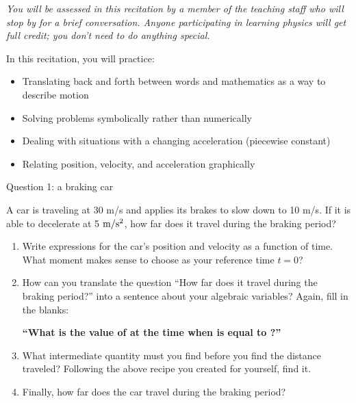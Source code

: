 \documentclass[12pt]{article}
\newcommand{\BI}{\begin{itemize}}
\newcommand{\EI}{\end{itemize}}
\begin{document}
\Large
\centerline{}
\normalsize
\centerline{}

\it You will be assessed in this recitation by a member of the teaching staff who will stop by for a brief conversation. Anyone participating in learning physics will get full credit; you don't need to do anything special.

\rmfamily

\medskip

\rm In this recitation, you will practice:

\BI
\item Translating back and forth between words and mathematics as a way to describe motion
\item Solving problems symbolically rather than numerically
\item Dealing with situations with a changing acceleration (piecewise constant)
\item Relating position, velocity, and acceleration graphically
\EI
\newpage


\centerline{\Large Question 1: a braking car}


A car is traveling at 30 m/s and applies its brakes to slow down to 10 m/s. If it is able to decelerate at 5 $\rm m/\rm s^2$, how far does it travel during the braking period?

\begin{enumerate}
\item Write expressions for the car's position and velocity as a function of time. What moment makes sense to choose as your reference time $t=0$?

\vspace{1in}


\item How can you translate the question ``How far does it travel during the braking period?'' into a sentence about your algebraic variables? Again, fill in the blanks: 

\begin{center}
{\bf ``What is the value of \underline{\hspace{0.7in}} at the time when \underline{\hspace{0.7in}} is equal to \underline{\hspace{0.7in}}?''} 
\end{center}


\item What intermediate quantity must you find before you find the distance traveled? Following the above recipe you created for yourself, find it.




\vspace{2in}





\item Finally, how far does the car travel during the braking period?



\end{enumerate}
\end{document}
